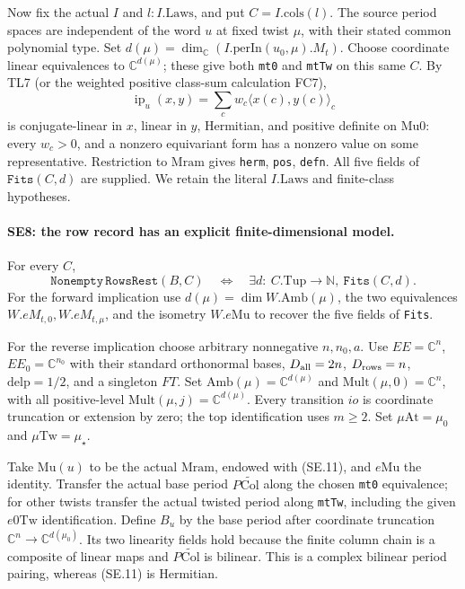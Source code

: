 Now fix the actual $I$ and $l:I.\mathrm{Laws}$, and put $C=I.\mathrm{cols}(l)$.
The source period spaces are independent of the word $u$ at fixed
twist $\mu$, with their stated common polynomial type. Set
$d(\mu)=\dim_{\mathbb C}(I.\mathrm{perIn}(u_0,\mu).M_t)$.
Choose coordinate linear equivalences to $\mathbb C^{d(\mu)}$;
these give both \texttt{mt0} and \texttt{mtTw} on this same $C$.
By TL7 (or the weighted positive class-sum calculation FC7),
\[
 \operatorname{ip}_u(x,y)=
 \sum_c w_c\langle x(c),y(c)\rangle_c
 \tag{SE.11}
\]
is conjugate-linear in $x$, linear in $y$, Hermitian, and positive
definite on $\mathrm{Mu0}$: every $w_c>0$, and a nonzero equivariant
form has a nonzero value on some representative. Restriction to
$\mathrm{Mram}$ gives \texttt{herm}, \texttt{pos}, \texttt{defn}.
All five fields of $\texttt{Fits}(C,d)$ are supplied. We retain the
literal $I.\mathrm{Laws}$ and finite-class hypotheses.

\paragraph{SE8: the row record has an explicit finite-dimensional model.}
For every $C$,
\[
 \texttt{Nonempty}\,\texttt{RowsRest}(B,C)
 \quad\Longleftrightarrow\quad
 \exists d:\ C.\mathrm{Tup}\to\mathbb N,\ \texttt{Fits}(C,d).
 \tag{SE.12}
\]
For the forward implication use $d(\mu)=\dim W.\mathrm{Amb}(\mu)$,
the two equivalences $W.eM_{t,0},W.eM_{t,\mu}$, and the isometry
$W.e\mathrm{Mu}$ to recover the five fields of \texttt{Fits}.

For the reverse implication choose arbitrary nonnegative $n,n_0,a$.
Use $EE=\mathbb C^n$, $EE_0=\mathbb C^{n_0}$ with their standard
orthonormal bases, $D_{\rm all}=2n$, $D_{\rm rows}=n$,
$\mathrm{delp}=1/2$, and a singleton $FT$. Set
$\mathrm{Amb}(\mu)=\mathbb C^{d(\mu)}$ and
$\mathrm{Mult}(\mu,0)=\mathbb C^n$, with all positive-level
$\mathrm{Mult}(\mu,j)=\mathbb C^{d(\mu)}$.
Every transition $io$ is coordinate truncation or extension by zero;
the top identification uses $m\ge2$.
Set $\mu\mathrm{At}=\mu_0$ and $\mu\mathrm{Tw}=\mu_\star$.

Take $\mathrm{Mu}(u)$ to be the actual $\mathrm{Mram}$, endowed with
(SE.11), and $e\mathrm{Mu}$ the identity. Transfer the actual base
period $P\widetilde{\mathrm{Col}}$ along the chosen \texttt{mt0}
equivalence; for other twists transfer the actual twisted period along
\texttt{mtTw}, including the given $e0\mathrm{Tw}$ identification.
Define $B_u$ by the base period after coordinate truncation
$\mathbb C^n\to\mathbb C^{d(\mu_0)}$. Its two linearity fields
hold because the finite column chain is a composite of linear maps
and $P\widetilde{\mathrm{Col}}$ is bilinear. This is a complex
bilinear period pairing, whereas (SE.11) is Hermitian.

